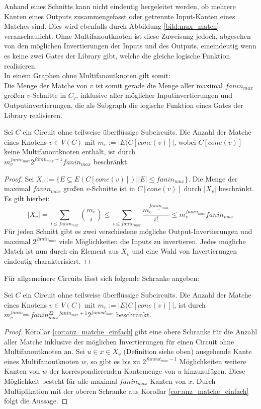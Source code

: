 \documentclass[11pt, a4paper, german]{article}
\begin{document}
Anhand eines Schnitts kann nicht eindeutig hergeleitet werden, ob mehrere Kanten eines Outputs zusammengefasst oder getrennte Input-Kanten eines Matches sind. Dies wird ebenfalls durch Abbildung \ref{bild:mux_match} veranschaulicht. Ohne Multifanoutknoten ist diese Zuweisung jedoch, abgesehen von den möglichen Invertierungen der Inputs und des Outputs, eineindeutig wenn es keine zwei Gates der Library gibt, welche die gleiche  logische Funktion realisieren.\\
In einem Graphen ohne Multifanoutknoten gilt somit: \\
Die Menge der Matche von $v$ ist somit gerade die Menge aller maximal $fanin_{max}$ großen $v$-Schnitte in $\bar{C}_v$, inklusive aller möglicher Inputinvertierungen und Outputinvertierungen, die als Subgraph die logische Funktion eines Gates der Library realisieren.
\begin{cor}\label{cor:anz_matche_einfach}
Sei $C$ ein Circuit ohne teilweise überflüssige Subcircuits. Die Anzahl der Matche eines Knotens $v\in V(C)$ mit $m_v := |E(C[cone(v)]|$, wobei $C[cone(v)]$ keine Multifanoutknoten enthält, ist durch\\ $m_v^{fanin_{max}} 2^{fanin_{max}+1} fanin_{max}$ beschränkt.
\end{cor}
\begin{proof}
Sei  $X_v:= \{ E \subseteq E(C[cone(v)]) | |E|\leq fanin_{max}  \}$. Die Menge der maximal $fanin_{max}$ großen $v$-Schnitte ist in $C[cone(v)]$ durch $ |X_v|$ beschränkt. Es gilt hierbei:
\[ |X_v| =\sum\limits_{i \leq fanin_{max}} \binom{m_v}{i} \leq  \sum\limits_{i \leq fanin_{max}}\dfrac{m_v^{\underline{fanin_{max}}}}{i!} \leq m_v^{fanin_{max}} fanin_{max} \]
Für jeden Schnitt gibt es zwei verschiedene mögliche Output-Invertierungen und maximal  $2^{fanin_{max}}$ viele Möglichkeiten die Inputs zu invertieren. Jedes mögliche Match ist nun durch ein Element aus $X_v$ und eine Wahl von Invertierungen eindeutig charakterisiert.
\end{proof}
Für allgemeinere Circuits lässt sich folgende Schranke angeben: 
\begin{cor}\label{cor:anzahl_matche_bel}
Sei $C$ ein Circuit ohne teilweise überflüssige Subcircuits. Die Anzahl der Matche eines Knotens $v\in V(C)$ mit $m_v := |E(C[cone(v)]|$, ist durch \\ $m_v^{fanin_{max}} fanin_{max}^22^{fanin_{max}+1}2^{fanout_{max}}$ beschränkt.
\end{cor}
\begin{proof}
Korollar \ref{cor:anz_matche_einfach} gibt eine obere Schranke für die Anzahl aller Matche inklusive der möglichen Invertierungen für einen Circuit ohne Multifanoutknoten an. Sei $u \in x \in X_v$ (Definition siehe oben) ausgehende Kante eines Multifanoutknoten $w$, so gibt es bis zu $2^{fanout_{max}-1}$ Möglichkeiten weitere Kanten von $w$ der korrespondierenden Kantemenge von $u$ hinzuzufügen.  Diese Möglichkeit besteht für alle maximal $fanin_{max}$ Kanten von $x$. Durch Multiplikation mit der oberen Schranke aus Korollar \ref{cor:anz_matche_einfach} folgt die Aussage.
\end{proof}
\end{document}

